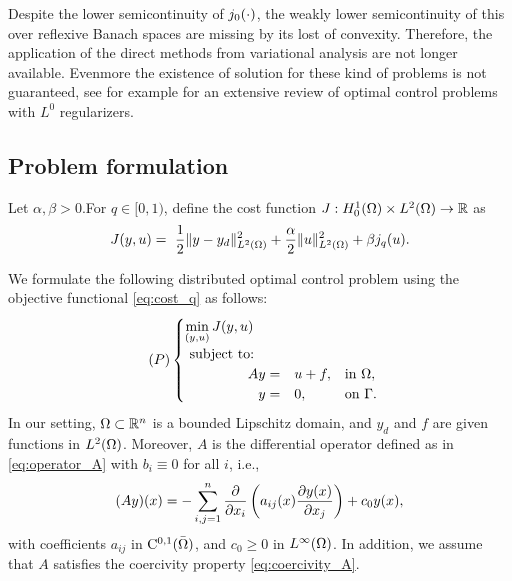 Despite the lower semicontinuity of $j_0(\cdot)$, the weakly lower semicontinuity
of this over reflexive Banach spaces are missing by its lost of convexity. Therefore, the
application of the direct methods from variational analysis are not longer available. Evenmore
the existence of solution for these kind of problems is not guaranteed, see for example \cite{ito-kunisch2014}
for an extensive review of optimal control problems with $L^0$ regularizers.
		
		\subsection{Problem formulation}
		Let $\alpha, \beta>0$.For $q\in [0,1)$, define the cost function  $J: H_0^1(\Omega) \times L^2(\Omega) \to \mathbb{R}$ as
	\begin{equation}\label{eq:cost_q}
		\displaystyle J{(y,u)}= ~\frac{1}{2}\| y-y_d \|^2_{L^2(\Omega)}+\frac{ \alpha}{2}\|u\|^2_{L^2(\Omega)}+\beta j_q(u).
	\end{equation}

We formulate the following distributed optimal control problem using the objective functional \eqref{eq:cost_q} as follows:
	\begin{equation}
		\tag{$P$} \label{eq:OCP}
		\begin{cases}
			\displaystyle\min_{(y,u)} J(y,u)\\
			\hbox{ subject to: }\\
			\hspace{40pt}\begin{array}{rll}
				A y=&u + f, &\hbox{in  } \Omega, \\
				y=&0, &\hbox{on  }  \Gamma.
			\end{array}			
		\end{cases}
	\end{equation}
	In our setting, $\Omega \subset \mathbb{R}^n$ is a bounded Lipschitz domain, and $y_d$ and $f$ are given functions in $L^2(\Omega)$.
	Moreover, $A$ is the differential operator defined as in \eqref{eq:operator_A} with $b_i\equiv 0$ for all $i$, i.e.,
	\begin{equation}\label{eq:A}
		(Ay) (x) = - \sum_{i,j=1}^n \frac{\partial}{\partial x_i}	\left( a_{ij}(x)\frac{\partial y(x)} {\partial x_j }\right) +c_0 y(x),
	\end{equation}
	with coefficients $a_{ij}$ in $\rm{C}^{0,1}(\bar{\Omega})$, and $c_0\geq 0$ in $L^{\infty}(\Omega)$. In addition, we assume that
	$A$ satisfies the coercivity property \eqref{eq:coercivity_A}.

